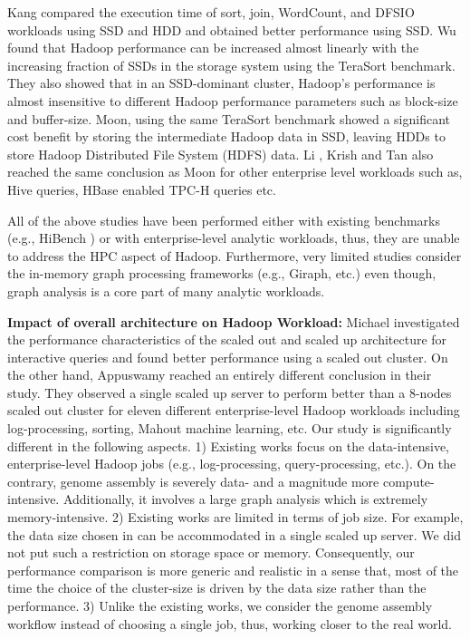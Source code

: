 \documentclass[conference]{IEEEtran}
\begin{document}
Kang \cite{ssdhdd:kang} compared the execution time of sort, join, WordCount, and DFSIO workloads using SSD and HDD and obtained better performance using SSD. Wu \cite{ssdhdd:wu} found that Hadoop performance can be increased almost linearly with the increasing fraction of SSDs in the storage system using the TeraSort benchmark. They also showed that in an SSD-dominant cluster, Hadoop's performance is almost insensitive to different Hadoop performance parameters such as block-size and buffer-size. Moon, using the same TeraSort benchmark \cite{ssdhdd:moon} showed a significant cost benefit by storing the intermediate Hadoop data in SSD, leaving HDDs to store Hadoop Distributed File System (HDFS) data. Li \cite{ssdhdd:li}, Krish \cite{ssdhdd:krish} and Tan \cite{ssdhdd:tan} also reached the same conclusion as Moon \cite{ssdhdd:moon} for other enterprise level workloads such as, Hive queries, HBase enabled TPC-H queries etc. 

All of the above studies have been performed either with existing benchmarks (e.g., HiBench \cite{bm:hibench}) or with enterprise-level analytic workloads, thus, they are unable to address the HPC aspect of Hadoop. Furthermore, very limited studies consider the in-memory graph processing frameworks (e.g., Giraph, etc.) even though, graph analysis is a core part of many analytic workloads.

\textbf{Impact of overall architecture on Hadoop Workload:} 
Michael \cite{scaleupscaleout:michael} investigated the performance characteristics of the scaled out and scaled up architecture for interactive queries and found better performance using a scaled out cluster. On the other hand, Appuswamy \cite{scaleupscaleout:appuswamy} reached an entirely different conclusion in their study. They observed a single scaled up server to perform better than a 8-nodes scaled out cluster for eleven different enterprise-level Hadoop workloads including log-processing, sorting, Mahout machine learning, etc. Our study is significantly different in the following aspects. 
1) Existing works focus on the data-intensive, enterprise-level Hadoop jobs (e.g., log-processing, query-processing, etc.). On the contrary, genome assembly is severely data- and a magnitude more compute-intensive. Additionally, it involves a large graph analysis which is extremely memory-intensive. 
2) Existing works are limited in terms of job size. For example, the data size chosen in \cite{scaleupscaleout:appuswamy} can be accommodated in a single scaled up server. We did not put such a restriction on storage space or memory. Consequently, our performance comparison is more generic and realistic in a sense that, most of the time the choice of the cluster-size is driven by the data size rather than the performance. 
3) Unlike the existing works, we consider the genome assembly workflow instead of choosing a single job, thus, working closer to the real world.
\end{document}
